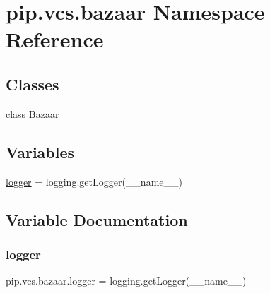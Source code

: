 \hypertarget{namespacepip_1_1vcs_1_1bazaar}{}\section{pip.\+vcs.\+bazaar Namespace Reference}
\label{namespacepip_1_1vcs_1_1bazaar}
\subsection*{Classes}
\begin{DoxyCompactItemize}
\item 
class \hyperlink{classpip_1_1vcs_1_1bazaar_1_1_bazaar}{Bazaar}
\end{DoxyCompactItemize}
\subsection*{Variables}
\begin{DoxyCompactItemize}
\item 
\hyperlink{namespacepip_1_1vcs_1_1bazaar_a6140262b36a6ad0e64cc7e3edcd2d223}{logger} = logging.\+get\+Logger(\+\_\+\+\_\+name\+\_\+\+\_\+)
\end{DoxyCompactItemize}


\subsection{Variable Documentation}
\mbox{\label{namespacepip_1_1vcs_1_1bazaar_a6140262b36a6ad0e64cc7e3edcd2d223}} 
\subsubsection{\texorpdfstring{logger}{logger}}
{\footnotesize\ttfamily pip.\+vcs.\+bazaar.\+logger = logging.\+get\+Logger(\+\_\+\+\_\+name\+\_\+\+\_\+)}


